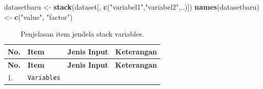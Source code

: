 \documentclass[12pt,]{krantz}
\newenvironment{Shaded}{\begin{snugshade}}{\end{snugshade}}
\newcommand{\KeywordTok}[1]{\textcolor[rgb]{0.13,0.29,0.53}{\textbf{#1}}}
\newcommand{\NormalTok}[1]{#1}
\newcommand{\StringTok}[1]{\textcolor[rgb]{0.31,0.60,0.02}{#1}}
\begin{document}
\begin{Shaded}
\begin{Highlighting}[]
\NormalTok{datasetbaru <-}\StringTok{ }\KeywordTok{stack}\NormalTok{(dataset[, }\KeywordTok{c}\NormalTok{(}\StringTok{"variabel1"}\NormalTok{,}\StringTok{"variabel2"}\NormalTok{,..)])}
\KeywordTok{names}\NormalTok{(datasetbaru) <-}\StringTok{ }\KeywordTok{c}\NormalTok{(}\StringTok{"value"}\NormalTok{, }\StringTok{"factor"}\NormalTok{)}
\end{Highlighting}
\end{Shaded}

\begin{longtable}[]{@{}llll@{}}
\caption{\label{tab:stack} Penjelasan item jendela stack variables.}\tabularnewline
\toprule
\begin{minipage}[b]{0.04\columnwidth}\raggedright
\textbf{No.}\strut
\end{minipage} & \begin{minipage}[b]{0.15\columnwidth}\raggedright
\textbf{Item}\strut
\end{minipage} & \begin{minipage}[b]{0.09\columnwidth}\raggedright
\textbf{Jenis Input}\strut
\end{minipage} & \begin{minipage}[b]{0.60\columnwidth}\raggedright
\textbf{Keterangan}\strut
\end{minipage}\tabularnewline
\midrule
\endfirsthead
\toprule
\begin{minipage}[b]{0.04\columnwidth}\raggedright
\textbf{No.}\strut
\end{minipage} & \begin{minipage}[b]{0.15\columnwidth}\raggedright
\textbf{Item}\strut
\end{minipage} & \begin{minipage}[b]{0.09\columnwidth}\raggedright
\textbf{Jenis Input}\strut
\end{minipage} & \begin{minipage}[b]{0.60\columnwidth}\raggedright
\textbf{Keterangan}\strut
\end{minipage}\tabularnewline
\midrule
\endhead
\begin{minipage}[t]{0.04\columnwidth}\raggedright
1.\strut
\end{minipage} & \begin{minipage}[t]{0.15\columnwidth}\raggedright
\texttt{Variables}\strut
\end{minipage} & \begin{minipage}[t]{0.09\columnwidth}\raggedright

\end{minipage}
\end{longtable}
\end{document}
